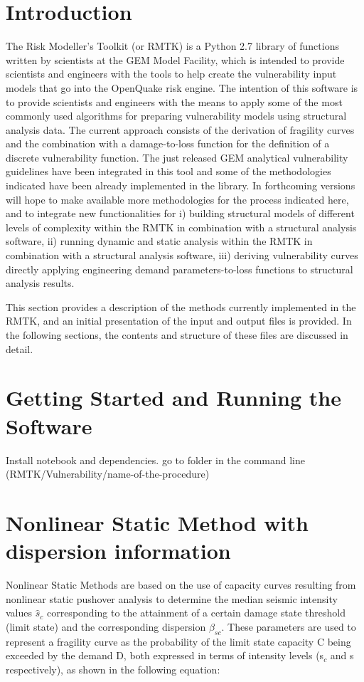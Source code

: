 
\section{Introduction}
The Risk Modeller's Toolkit (or RMTK) is a Python 2.7 library of functions written by scientists at the GEM Model Facility, which is intended to provide scientists and engineers with the tools to help create the vulnerability input models that go into the OpenQuake risk engine. The intention of this software is to provide scientists and engineers with the means to apply some of the most commonly used algorithms for preparing vulnerability models using structural analysis data. The current approach consists of the derivation of fragility curves and the combination with a damage-to-loss function for the definition of a discrete vulnerability function. The just released GEM analytical vulnerability guidelines have been integrated in this tool and some of the methodologies indicated have been already implemented in the library. In forthcoming versions will hope to make available more methodologies for the process indicated here, and to integrate new functionalities for i) building structural models of different levels of complexity within the RMTK in combination with a structural analysis software, ii) running dynamic and static analysis within the RMTK in combination with a structural analysis software, iii) deriving vulnerability curves directly applying engineering demand parameters-to-loss functions to structural analysis results.

This section provides a description of the methods currently implemented in the RMTK, and an initial presentation of the input and output files is provided. In the following sections, the contents and structure of these files are discussed in detail.

\section{Getting Started and Running the Software}
Install notebook and dependencies. go to folder in the command line (RMTK/Vulnerability/name-of-the-procedure)
 
\section{Nonlinear Static Method with dispersion information}
Nonlinear Static Methods are based on the use of capacity curves resulting from nonlinear static pushover analysis to determine the median seismic intensity values $\hat{s}_c$ corresponding to the attainment of a certain damage state threshold (limit state) and the corresponding dispersion $\beta_{sc}$. These parameters are used to represent a fragility curve as the probability of the limit state capacity C being exceeded by the demand D, both expressed in terms of intensity levels (s$_c$ and s respectively), as shown in the following equation:

